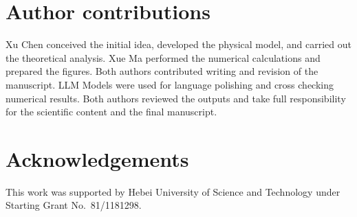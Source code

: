 \section*{Author contributions}

Xu Chen conceived the initial idea, developed the physical model, and carried out the theoretical analysis. Xue Ma performed the numerical calculations and prepared the figures. Both authors contributed writing and revision of the manuscript. LLM Models were used for language polishing and cross checking numerical results. Both authors reviewed the  outputs and take full responsibility for the scientific content and the final manuscript.

\section*{Acknowledgements}

This work was supported by Hebei University of Science and Technology under
Starting Grant No.~81/1181298.
